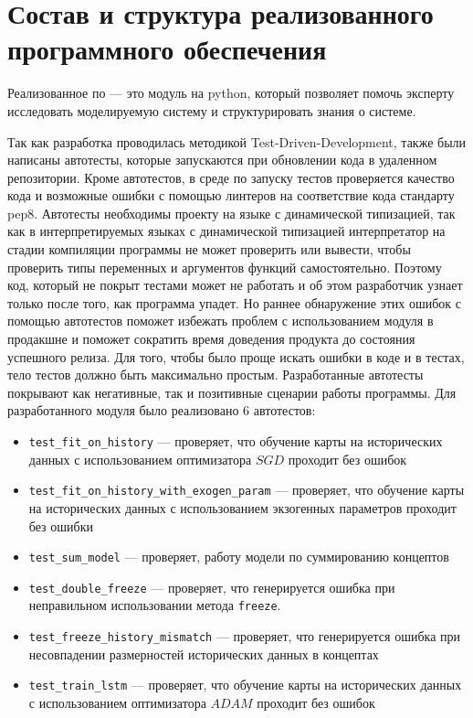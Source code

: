 \section{Состав и структура реализованного программного обеспечения}

Реализованное по --- это модуль на python, который позволяет помочь эксперту
исследовать моделируемую систему и структурировать знания о системе.

Так как разработка проводилась методикой Test-Driven-Development,
также были написаны автотесты, которые запускаются
при обновлении кода в удаленном репозитории. Кроме автотестов,
в среде по запуску тестов проверяется качество кода и возможные ошибки
с помощью линтеров на соответствие кода стандарту pep8.
Автотесты необходимы проекту на языке с динамической типизацией,
так как в интерпретируемых языках с динамической типизацией
интерпретатор на стадии компиляции программы не может проверить или вывести, чтобы проверить
типы переменных и аргументов функций самостоятельно. Поэтому код, который
не покрыт тестами может не работать и об этом разработчик узнает
только после того, как программа упадет. Но раннее обнаружение этих
ошибок с помощью автотестов поможет избежать проблем с использованием модуля в
продакшне и поможет сократить время доведения продукта до состояния успешного релиза.
Для того, чтобы было проще искать ошибки в коде и в тестах,
тело тестов должно быть максимально простым.
Разработанные автотесты покрывают как негативные, так и позитивные
сценарии работы программы.
Для разработанного модуля было реализовано 6 автотестов:

\begin{itemize}
	\item \verb|test_fit_on_history| --- проверяет, что обучение карты на исторических данных с использованием оптимизатора $ SGD $ проходит без ошибок
	\item \verb|test_fit_on_history_with_exogen_param| --- проверяет, что обучение карты на исторических данных с использованием экзогенных параметров проходит без ошибки
	\item \verb|test_sum_model| --- проверяет, работу модели по суммированию концептов
	\item \verb|test_double_freeze| --- проверяет, что генерируется ошибка при неправильном использовании метода \verb|freeze|.
	\item \verb|test_freeze_history_mismatch| --- проверяет, что генерируется ошибка при несовпадении размерностей исторических данных в концептах
	\item \verb|test_train_lstm| --- проверяет, что обучение карты на исторических данных с использованием оптимизатора $ ADAM $ проходит без ошибок
\end{itemize}

